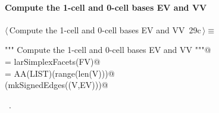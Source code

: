 \documentclass[11pt,oneside]{article}	%
\begin{document}
\paragraph{Compute the 1-cell and 0-cell bases EV and VV}
\begin{flushleft} \small \label{scrap50}
\protect{}$\langle\,$Compute the 1-cell and 0-cell bases EV and VV\nobreak\ {\footnotesize 29c}$\,\rangle\equiv$
\vspace{-1ex}
\begin{list}{}{} \item
\mbox{}\verb@""" Compute the 1-cell and 0-cell bases EV and VV """@\\
\mbox{}\verb@EV = larSimplexFacets(FV)@\\
\mbox{}\verb@VV = AA(LIST)(range(len(V)))@\\
\mbox{}\verb@VIEW(mkSignedEdges((V,EV)))@\\
\mbox{}\verb@@{\NWsep}
\end{list}
\vspace{-1ex}
\footnotesize\addtolength{\baselineskip}{-1ex}
\begin{list}{}{\setlength{\itemsep}{-\parsep}\setlength{\itemindent}{-\leftmargin}}
\item \NWtxtMacroRefIn\ .
\end{list}
\end{flushleft}
\end{document}
